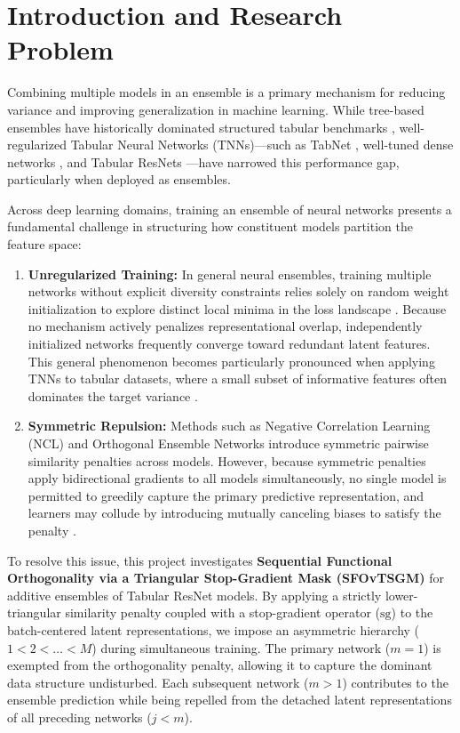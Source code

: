 \documentclass[11pt, a4paper]{article}
\begin{document}
\section{Introduction and Research Problem}
Combining multiple models in an ensemble is a primary mechanism for reducing variance and improving generalization in machine learning. While tree-based ensembles have historically dominated structured tabular benchmarks \cite{grinsztajn2022why}, well-regularized Tabular Neural Networks (TNNs)—such as TabNet \cite{arik2021tabnet}, well-tuned dense networks \cite{kadra2021well}, and Tabular ResNets \cite{grinsztajn2022why}—have narrowed this performance gap, particularly when deployed as ensembles.

Across deep learning domains, training an ensemble of neural networks presents a fundamental challenge in structuring how constituent models partition the feature space:
\begin{enumerate}
    \item \textbf{Unregularized Training:} In general neural ensembles, training multiple networks without explicit diversity constraints relies solely on random weight initialization to explore distinct local minima in the loss landscape \cite{fort2019deep}. Because no mechanism actively penalizes representational overlap, independently initialized networks frequently converge toward redundant latent features. This general phenomenon becomes particularly pronounced when applying TNNs to tabular datasets, where a small subset of informative features often dominates the target variance \cite{grinsztajn2022why}.
    \item \textbf{Symmetric Repulsion:} Methods such as Negative Correlation Learning (NCL) \cite{liu1999ensemble} and Orthogonal Ensemble Networks \cite{larrazabal2021orthogonal} introduce symmetric pairwise similarity penalties across models. However, because symmetric penalties apply bidirectional gradients to all models simultaneously, no single model is permitted to greedily capture the primary predictive representation, and learners may collude by introducing mutually canceling biases to satisfy the penalty \cite{jeffares2023joint}.
\end{enumerate}

To resolve this issue, this project investigates \textbf{Sequential Functional Orthogonality via a Triangular Stop-Gradient Mask (SFOvTSGM)} for additive ensembles of Tabular ResNet models. By applying a strictly lower-triangular similarity penalty coupled with a stop-gradient operator ($\text{sg}$) to the batch-centered latent representations, we impose an asymmetric hierarchy ($1 < 2 < \dots < M$) during simultaneous training. The primary network ($m=1$) is exempted from the orthogonality penalty, allowing it to capture the dominant data structure undisturbed. Each subsequent network ($m > 1$) contributes to the ensemble prediction while being repelled from the detached latent representations of all preceding networks ($j < m$).
\end{document}
